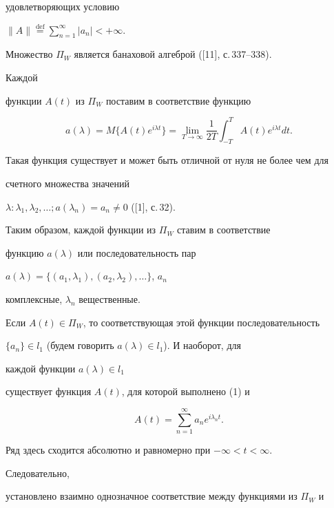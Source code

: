 удовлетворяющих условию 


$\|A\|\overset{\text{def}}{=}\sum\limits^\infty_{n=1}|a_n|<+\infty$. 


Множество $\Pi_W$ является банаховой алгеброй ([11], с.\,337--338). 


Каждой  


функции $A(t)$ из $\Pi_W$ поставим в соответствие функцию 


\begin{equation} 


a(\lambda)=M\{A(t)e^{i\lambda t}\}=\lim_{T\to\infty}\frac{1}{2T}


\int^T_{-T}A(t)e^{i\lambda t}dt. 


\end{equation} 


Такая функция существует и может быть отличной от нуля не более чем для  


счетного множества значений 


$\lambda:\lambda_1,\lambda_2,\dotsc;a(\lambda_n)=a_n\ne0$ ([1], с.\,32). 


 


Таким образом, каждой функции из $\Pi_W$ ставим в соответствие  


функцию $a(\lambda)$ или последовательность пар 


$a(\lambda)=\{(a_1,\lambda_1),(a_2,\lambda_2),\dotsc\}$, $a_n$


комплексные, $\lambda_n$ вещественные. 


 


Если $A(t)\in\Pi_W$, то соответствующая этой функции последовательность 


$\{a_n\}\in l_1$ (будем говорить $a(\lambda)\in l_1$). И наоборот, для 


каждой функции $a(\lambda)\in l_1$ 


существует функция $A(t)$, для которой выполнено (1) и 


\begin{equation} 


A(t)=\sum^\infty_{n=1}a_n e^{i\lambda_n t}. 


\end{equation} 


Ряд здесь сходится абсолютно и равномерно при $-\infty<t<\infty$. 


Следовательно,  


установлено взаимно однозначное соответствие между функциями из $\Pi_W$ и  


